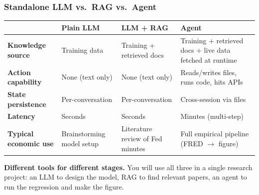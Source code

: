 \documentclass[10pt,english,aspectratio=169]{beamer}
\begin{document}
\begin{frame}
\frametitle{Standalone LLM vs.\ RAG vs.\ Agent}

\begin{center}
\small
\begin{tabular}{|p{2.4cm}|p{2.7cm}|p{2.9cm}|p{4.2cm}|}
\hline
& \textbf{Plain LLM} & \textbf{LLM + RAG} & \textbf{Agent} \\ \hline
\textbf{Knowledge source} & Training data & Training + retrieved docs & Training + retrieved docs + live data fetched at runtime \\ \hline
\textbf{Action capability} & None (text only) & None (text only) & Reads/writes files, runs code, hits APIs \\ \hline
\textbf{State persistence} & Per-conversation & Per-conversation & Cross-session via files \\ \hline
\textbf{Latency} & Seconds & Seconds & Minutes (multi-step) \\ \hline
\textbf{Typical economic use} & Brainstorming model setup & Literature review of Fed minutes & Full empirical pipeline (FRED $\to$ figure) \\ \hline
\end{tabular}
\end{center}

\vspace{0.3cm}

\textbf{Different tools for different stages.} You will use all three in a single research project: an LLM to design the model, RAG to find relevant papers, an agent to run the regression and make the figure.
\end{frame}
\end{document}
